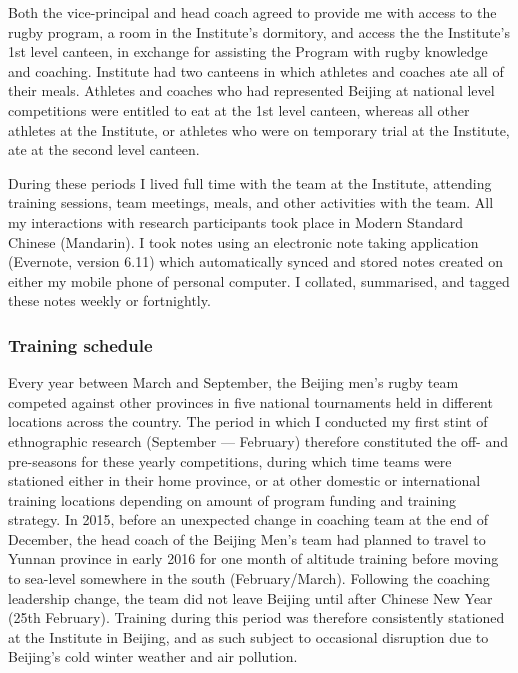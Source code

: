 Both the vice-principal and head coach agreed to provide me with access to the rugby program, a room in the Institute's dormitory, and access the the Institute's 1st level canteen, in exchange for assisting the Program with rugby knowledge and coaching.   Institute had two canteens in which athletes and coaches ate all of their meals.  Athletes and coaches who had represented Beijing at national level competitions were entitled to eat at the 1st level canteen, whereas all other athletes at the Institute, or athletes who were on temporary trial at the Institute, ate at the second level canteen.

During these periods I lived full time with the team at the Institute, attending training sessions, team meetings, meals, and other activities with the team.   All my interactions with research participants took place in Modern Standard Chinese (Mandarin).  I took notes using an electronic note taking application (Evernote, version 6.11) which automatically synced and stored notes created on either my mobile phone of personal computer. I collated, summarised, and tagged these notes weekly or fortnightly.





\subsubsection{Training schedule}

  Every year between March and September, the Beijing men's rugby team competed against other provinces in five national tournaments held in different locations across the country. The period in which I conducted my first stint of ethnographic research (September –-- February) therefore constituted the off- and pre-seasons for these yearly competitions, during which time teams were stationed either in their home province, or at other domestic or international training locations depending on amount of program funding and training strategy.  In 2015, before an unexpected change in coaching team at the end of December, the head coach of the Beijing Men's team had planned to travel to Yunnan province in early 2016 for one month of altitude training before moving to sea-level somewhere in the south (February/March).  Following the coaching leadership change, the team did not leave Beijing until after Chinese New Year (25th February). Training during this period was therefore consistently stationed at the Institute in Beijing, and as such subject to occasional disruption due to Beijing's cold winter weather and air pollution.

